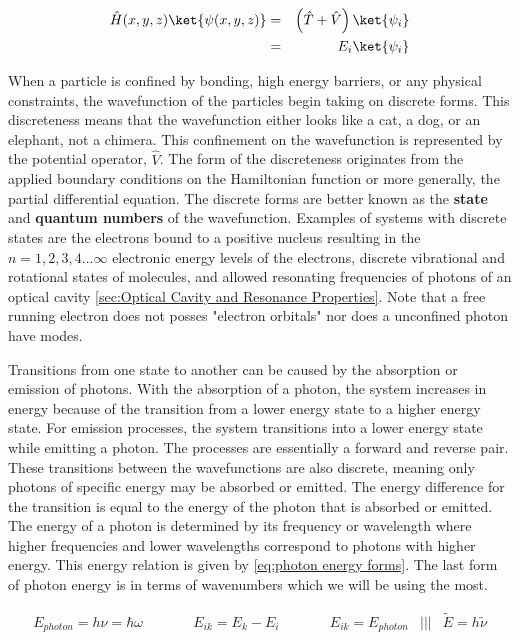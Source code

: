 \documentclass[11pt,a4paper]{book}
\begin{document}
	\begin{eqnarray}
		\label{eq:hamiltonian of wavefunction in braket notation}
		\hat{H}(x, y, z)\ket{\psi(x, y, z)}
		&=&\left( \hat{T} + \hat{V}\right) \ket{\psi_i}\\
		&=&E_i\ket{\psi_i}
	\end{eqnarray}
	
	When a particle is confined by bonding, high energy barriers, or any physical constraints, the wavefunction of the particles begin taking on discrete forms. This discreteness means that the wavefunction either looks like a cat, a dog, or an elephant, not a chimera. This confinement on the wavefunction is represented by the potential operator, $\hat{V}$. The form of the discreteness originates from the applied boundary conditions on the Hamiltonian function or more generally, the partial differential equation. The discrete forms are better known as the {\bfseries state} and {\bf quantum numbers} of the wavefunction. Examples of systems with discrete states are the electrons bound to a positive nucleus resulting in the $ n = 1, 2, 3, 4 ... \infty $ electronic energy levels of the electrons, discrete vibrational and rotational states of molecules, and allowed resonating frequencies of photons of an optical cavity \autoref{sec:Optical Cavity and Resonance Properties}. Note that a free running electron does not posses "electron orbitals" nor does a unconfined photon have modes.
	
	
	Transitions from one state to another can be caused by the absorption or emission of photons. With the absorption of a photon, the system increases in energy because of the transition from a lower energy state to a higher energy state. For emission processes, the system transitions into a lower energy state while emitting a photon. The processes are essentially a forward and reverse pair. These transitions between the wavefunctions are also discrete, meaning only photons of specific energy may be absorbed or emitted. The energy difference for the transition is equal to the energy of the photon that is absorbed or emitted. The energy of a photon is determined by its frequency or wavelength where higher frequencies and lower wavelengths correspond to photons with higher energy. This energy relation is given by \autoref{eq:photon energy forms}. The last form of photon energy is in terms of wavenumbers which we will be using the most.
	
	\begin{equation}
		\label{eq:photon energy forms}
		\begin{array}{cccccccc}
		E_{photon}=h\nu=\hbar \omega &\qquad &E_{ik}=E_{k}-E_{i}  & \qquad & E_{ik} = E_{photon}& ||| &\tilde{E}=h\tilde{\nu}
		\end{array}
	\end{equation} 
	
\end{document}
